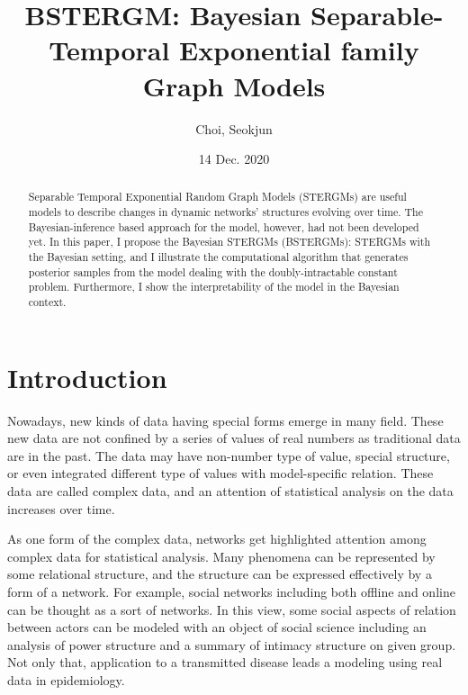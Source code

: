 \documentclass[aspectratio=169,ignorenonframetext,9pt]{beamer}
\title{BSTERGM: Bayesian Separable-Temporal Exponential family Graph Models}
\author{Choi, Seokjun}
\date{14 Dec. 2020}
\theoremstyle{plain}
\theoremstyle{definition}
\begin{document}
\begin{frame}
\maketitle
\end{frame}


\begin{abstract}
Separable Temporal Exponential Random Graph Models (STERGMs) are useful models to describe changes in dynamic networks' structures evolving over time. 
The Bayesian-inference based approach for the model, however, had not been developed yet. 
In this paper, I propose the Bayesian STERGMs (BSTERGMs): STERGMs with the Bayesian setting, and I illustrate the computational algorithm that generates posterior samples from the model dealing with the doubly-intractable constant problem. 
Furthermore, I show the interpretability of the model in the Bayesian context.

\end{abstract}



\section{Introduction}
Nowadays, new kinds of data having special forms emerge in many field.
These new data are not confined by a series of values of real numbers as traditional data are in the past. 
The data may have non-number type of value, special structure, or even integrated different type of values with model-specific relation.
These data are called complex data, and an attention of statistical analysis on the data increases over time.

As one form of the complex data, networks get highlighted attention among complex data for statistical analysis.
Many phenomena can be represented by some relational structure, and the structure can be expressed effectively
by a form of a network. For example, social networks including both offline and online can be thought as a sort of networks.
In this view, some social aspects of relation between actors can be modeled with an object of social science
including an analysis of power structure and a summary of intimacy structure on given group.
Not only that, application to a transmitted disease leads a modeling using real data in epidemiology.
\end{document}
